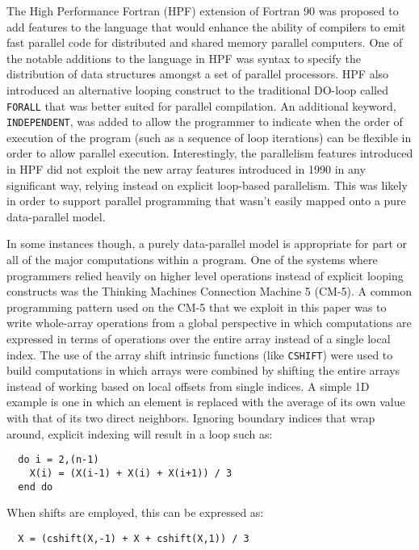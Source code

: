 The High Performance Fortran (HPF) extension of Fortran 90 was
proposed to add features to the language that would enhance the
ability of compilers to emit fast parallel code for distributed and
shared memory parallel computers\cite{koelbel94hpf}.  One of the
notable additions to the language in HPF was syntax to specify the
distribution of data structures amongst a set of parallel processors.
HPF also introduced an alternative looping construct to the
traditional DO-loop called {\tt FORALL} that was better suited for
parallel compilation.  An additional keyword, {\tt INDEPENDENT}, was
added to allow the programmer to indicate when the order of execution
of the program (such as a sequence of loop iterations) can be flexible
in order to allow parallel execution.  Interestingly, the parallelism
features introduced in HPF did not exploit the new array features
introduced in 1990 in any significant way, relying instead on explicit
loop-based parallelism.  This was likely in order to support parallel
programming that wasn't easily mapped onto a pure data-parallel model.

In some instances though, a purely data-parallel model is appropriate
for part or all of the major computations within a program.  One of
the systems where programmers relied heavily on higher level
operations instead of explicit looping constructs was the Thinking
Machines Connection Machine 5 (CM-5).  A common programming pattern
used on the CM-5 that we exploit in this paper was to write
whole-array operations from a global perspective in which computations
are expressed in terms of operations over the entire array instead of
a single local index.  The use of the array shift intrinsic functions
(like {\tt CSHIFT}) were used to build computations in which arrays
were combined by shifting the entire arrays instead of working based
on local offsets from single indices.  A simple 1D example is one in
which an element is replaced with the average of its own value with
that of its two direct neighbors.  Ignoring boundary indices that wrap
around, explicit indexing will result in a loop such as:

{\small
\begin{verbatim}
  do i = 2,(n-1)
    X(i) = (X(i-1) + X(i) + X(i+1)) / 3
  end do
\end{verbatim}
}

\noindent When shifts are employed, this can be expressed as:

{\small
\begin{verbatim}
  X = (cshift(X,-1) + X + cshift(X,1)) / 3
\end{verbatim}
}


